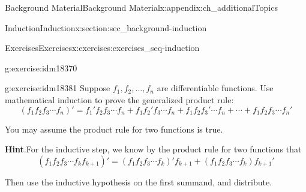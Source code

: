 \documentclass[oneside,10pt,]{book}
\numberwithin{equation}{chapter}
\begin{document}
\begin{appendixptx}{Background Material}{}{Background Material}{}{}{x:appendix:ch_additionalTopics}
\begin{sectionptx}{Induction}{}{Induction}{}{}{x:section:sec_background-induction}
\begin{exercises-subsection}{Exercises}{}{Exercises}{}{}{x:exercises:exercises_seq-induction}
\begin{divisionexercise}{22}{}{}{g:exercise:idm18370}
\end{divisionexercise}%
\begin{divisionexercise}{23}{}{}{g:exercise:idm18381}%
Suppose \(f_1, f_2, \ldots, f_n\) are differentiable functions. Use mathematical induction to prove the generalized product rule:%
\begin{equation*}
(f_1 f_2 f_3 \cdots f_n)' = f_1' f_2 f_3 \cdots f_n + f_1 f_2' f_3 \cdots f_n + f_1 f_2 f_3' \cdots f_n + \cdots + f_1 f_2 f_3 \cdots f_n'
\end{equation*}
%
\par
You may assume the product rule for two functions is true.%
\par\smallskip%
\noindent\textbf{Hint}.\hypertarget{g:hint:idm18387}{}\quad{}For the inductive step, we know by the product rule for two functions that%
\begin{equation*}
(f_1f_2f_3 \cdots f_k f_{k+1})' = (f_1f_2f_3\cdots f_k)'f_{k+1} + (f_1f_2f_3\cdots f_k)f_{k+1}'
\end{equation*}
%
\par
Then use the inductive hypothesis on the first summand, and distribute.%
\end{divisionexercise}%
\end{exercises-subsection}
\end{sectionptx}
\end{appendixptx}
%
%
\typeout{************************************************}
\typeout{************************************************}
%
\end{document}
